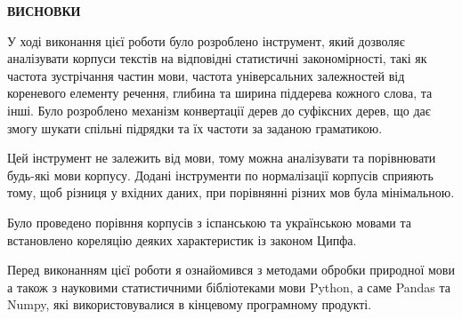 {}

\pagestyle{empty}

\begin{center}
\textbf{\Large ВИСНОВКИ}
\end{center}

У ході виконання цієї роботи було розроблено інструмент, який дозволяє аналізувати
корпуси текстів на відповідні статистичні закономірності, такі як частота зустрічання
частин мови, частота універсальних залежностей від кореневого елементу речення, глибина
та ширина піддерева кожного слова, та інші.
Було розроблено механізм конвертації дерев до суфіксних дерев, що дає змогу
шукати спільні підрядки та їх частоти за заданою граматикою.

Цей інструмент не залежить від мови, тому можна аналізувати та
порівнювати будь-які мови корпусу. 
Додані інструменти по нормалізації корпусів сприяють тому, щоб різниця
у вхідних даних, при порівнянні різних мов була мінімальною.

Було проведено порівння корпусів з іспанською та українською мовами та встановлено кореляцію
деяких характеристик із законом Ципфа.

Перед виконанням цієї роботи я ознайомився з методами обробки природної мови
а також з науковими статистичними бібліотеками мови Python, а саме Pandas та Numpy, які використовувалися
в кінцевому програмному продукті.
